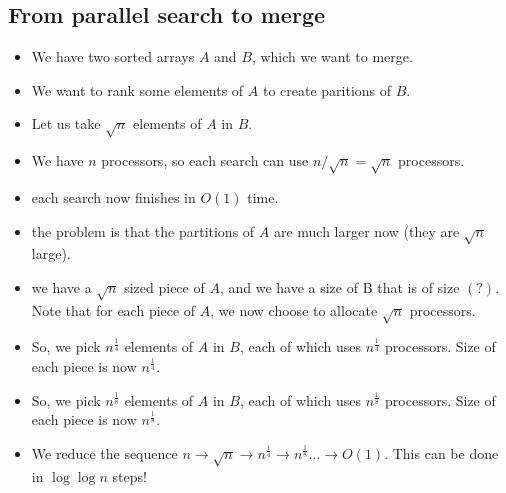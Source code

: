 \subsection{From parallel search to merge}
\begin{itemize}
    \item We have two sorted arrays $A$ and $B$, which we want to merge.
    \item We want to rank some elements of $A$ to create paritions of $B$.
    \item Let us take $\sqrt n$ elements of $A$ in $B$.
    \item We have $n$ processors, so each search can use $ n / \sqrt n = \sqrt n$ processors.
    \item each search now finishes in $O(1)$  time.
    \item the problem is that the partitions of $A$ are much larger now (they are $\sqrt n$ large).
    \item we have a $\sqrt n$ sized piece of $A$, and we have a size of B that is of size $(?)$.
        Note that for each piece of $A$, we now choose to allocate $\sqrt n$ processors.
    \item So, we pick $n^\frac{1}{4}$ elements of $A$ in $B$, each of which
        uses $n^\frac{1}{4}$ processors. Size of each piece is now $n^\frac{1}{4}$.
    \item So, we pick $n^\frac{1}{8}$ elements of $A$ in $B$, each of which
        uses $n^\frac{1}{8}$ processors. Size of each piece is now $n^\frac{1}{8}$.
    \item We reduce the sequence $n \to \sqrt n \to n^{\frac{1}{4}} \to n^\frac{1}{8} \dots \to O(1)$.
        This can be done in $\log \log n$ steps!
\end{itemize}

